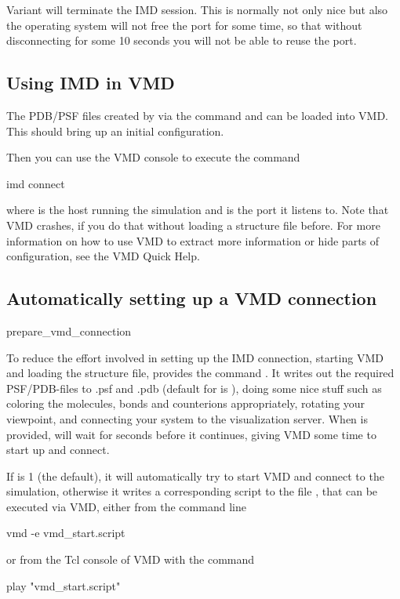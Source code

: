 Variant  will terminate the IMD session. This is normally
not only nice but also the operating system will not free the port for
some time, so that without disconnecting for some 10 seconds you will
not be able to reuse the port.

\subsection{Using IMD in VMD}

The PDB/PSF files created by \es via the command  and
 can be loaded into VMD. This should bring up an initial
configuration.

Then you can use the VMD console to execute the command
\begin{code}
  imd connect  
\end{code}
where  is the host running the simulation and  is
the port it listens to. Note that VMD crashes, if you do that without
loading a structure file before.  For more information on how to use
VMD to extract more information or hide parts of configuration, see
the VMD Quick Help.

\subsection{Automatically setting up a VMD connection}

\begin{essyntax}
prepare_vmd_connection 
\end{essyntax}

To reduce the effort involved in setting up the IMD connection,
starting VMD and loading the structure file, \es provides the command
.  It writes out the required
PSF/PDB-files to .psf and .pdb (default
for  is ), doing some nice stuff such as
coloring the molecules, bonds and counterions appropriately, rotating
your viewpoint, and connecting your system to the visualization
server. When  is provided, \es will wait for 
seconds before it continues, giving VMD some time to start up and
connect.

If  is 1 (the default), it will automatically try to start
VMD and connect to the \es simulation, otherwise it writes a
corresponding script to the file , that can be
executed via VMD, either from the command line
\begin{code}
  vmd -e vmd_start.script
\end{code}
or from the Tcl console of VMD with the command
\begin{code}
  play "vmd\_start.script"
\end{code}


